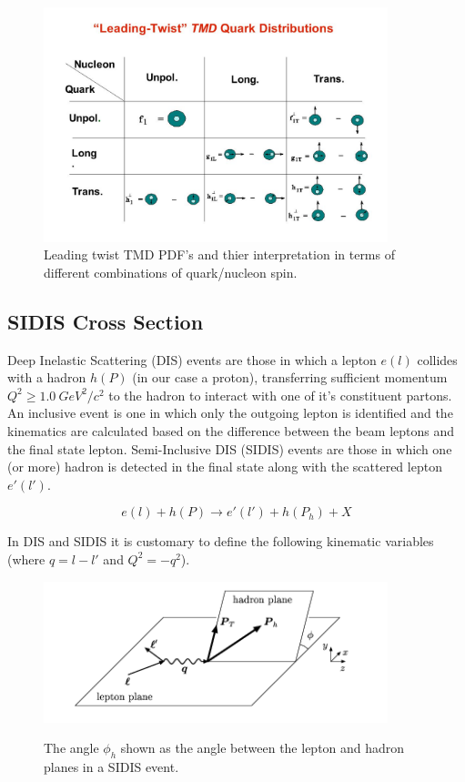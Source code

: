\begin{figure}
  \centering
  \includegraphics[width=10cm]{image/tmd-table.jpg}
  \caption{Leading twist TMD PDF's and thier interpretation in terms of different combinations of quark/nucleon spin.}
  \label{fig:tmd-table}
\end{figure}

\subsection{SIDIS Cross Section}
Deep Inelastic Scattering (DIS) events are those in which a lepton $e(l)$ collides with a hadron $h(P)$ (in our case a proton), transferring sufficient momentum $Q^{2} \geq 1.0 \: GeV^{2}/c^{2}$ to the hadron to interact with one of it's constituent partons.  An inclusive event is one in which only the outgoing lepton is identified and the kinematics are calculated based on the difference between the beam leptons and the final state lepton.  Semi-Inclusive DIS (SIDIS) events are those in which one (or more) hadron is detected in the final state along with the scattered lepton $e'(l')$.  

\begin{equation}
  e(l) + h(P) \rightarrow e'(l') + h(P_{h}) + X 
\end{equation}

In DIS and SIDIS it is customary to define the following kinematic variables (where $q = l - l'$ and $Q^{2} = -q^{2}$). 

\begin{figure}
  \centering
  \includegraphics[width=10cm]{image/PhiHadron.png}
  \label{fig:dis}
  \caption{ The angle $\phi_h$ shown as the angle between the lepton and hadron planes in a SIDIS event. }
\end{figure}

